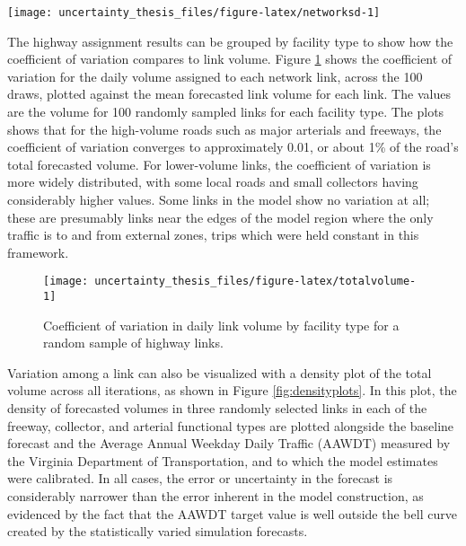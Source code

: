 \documentclass[fancy, masters, twoside]{byuthesis}
\begin{document}
\begin{sidewaysfigure}

{\centering \texttt{[image: uncertainty\_thesis\_files/figure-latex/networksd-1]} 

}

\caption{Standard deviation in daily forecasted volume.}\label{fig:networksd}
\end{sidewaysfigure}

The highway assignment results can be grouped by facility type to show how the coefficient of variation compares to link volume. Figure \ref{fig:totalvolume} shows the coefficient of variation for the daily volume assigned to each network link, across the 100 draws, plotted against the mean forecasted link volume for each link. The values are the volume for 100 randomly sampled links for each facility type. The plots shows that for the high-volume roads such as major arterials and freeways, the coefficient of variation converges to approximately 0.01, or about 1\% of the road's total forecasted volume. For lower-volume links, the coefficient of variation is more widely distributed, with some local roads and small collectors having considerably higher values. Some links in the model show no variation at all; these are presumably links near the edges of the model region where the only traffic is to and from external zones, trips which were held constant in this framework.

\begin{figure}

{\centering \texttt{[image: uncertainty\_thesis\_files/figure-latex/totalvolume-1]} 

}

\caption{Coefficient of variation in daily link volume by facility type for a random sample of highway links.}\label{fig:totalvolume}
\end{figure}

Variation among a link can also be visualized with a density plot of the total volume across all iterations, as shown in Figure \ref{fig:densityplots}. In this plot, the density of forecasted volumes in three randomly selected links in each of the freeway, collector, and arterial functional types are plotted alongside the baseline forecast and the Average Annual Weekday Daily Traffic (AAWDT) measured by the Virginia Department of Transportation, and to which the model estimates were calibrated. In all cases, the error or uncertainty in the forecast is considerably narrower than the error inherent in the model construction, as evidenced by the fact that the AAWDT target value is well outside the bell curve created by the statistically varied simulation forecasts.
\end{document}
